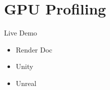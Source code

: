 \part{GPU Profiling}
\frame{\partpage}

\begin{frame}{Live Demo}
\begin{itemize}
	\pause \item Render Doc
	\pause \item Unity
	\pause \item Unreal 
\end{itemize}
\end{frame}
